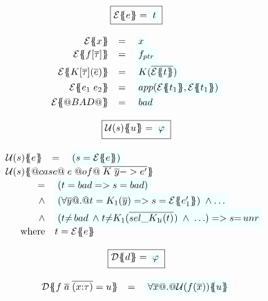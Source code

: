 \begin{figure}\small
\setlength{\arraycolsep}{2pt}
\[\begin{array}{c}
\ruleform{\etrans{\Sigma}{\Gamma}{e} = \formula{t} } \\ \\
\begin{array}{rcl}
\etrans{\Sigma}{\Gamma}{x} & = & \formula{x} \\
\etrans{\Sigma}{\Gamma}{f[\ol{\tau}]} & = & \formula{f_{ptr}} \\
\etrans{\Sigma}{\Gamma}{K[\ol{\tau}](\ol{e})} & = & \formula{K(\ol{\etrans{e}{\Gamma}{t}})} \\
\etrans{\Sigma}{\Gamma}{e_1\;e_2} & = & \formula{app(\etrans{\Sigma}{\Gamma}{t_1},
                                                     \etrans{\Sigma}{\Gamma}{t_1})} \\
\etrans{\Sigma}{\Gamma}{@BAD@} & = & \formula{\bad}
\end{array}
\\ \\
\ruleform{\utrans{\Sigma}{u}{s} = \formula{\phi}} \\ \\
\begin{array}{rcl}
\utrans{\Sigma}{e}{s}
  & = & \formula{(s = \etrans{\Sigma}{\Gamma}{e})} \\
\multicolumn{3}{l}{\utrans{\Sigma}
    {@case@\;e\;@of@\;\ol{K\;\ol{y} -> e'}}{s}} \\
\multicolumn{3}{l}{
\quad
  \begin{array}[t]{rl}
    = & \formula{(t = \bad => s = bad)} \\
    \land & \formula{(\forall \ol{y} @.@ t = K_1(\ol{y}) => s = \etrans{\Sigma}{\Gamma}{e'_1})\;\land \ldots}  \\
    \land & \formula{(t{\neq}\bad\;\land\;
                 t{\neq}K_1(\oln{{\sel{K_1}{i}}(t)}{})\;\land\;\ldots) => s{=}\unr} \\
    \mbox{where} & t  =  \etrans{\Sigma}{\Gamma}{e}
 \end{array}
}
\end{array}
\\ \\
\ruleform{\dtrans{\Sigma}{d} = \formula{\phi}} \\ \\
\begin{array}{rcl}
  \dtrans{\Sigma}{f \;\ol{a}\;\ol{(x{:}\tau)} = u}
    & =     & \formula{\forall \ol{x} @.@ \utrans{\sigma}{u}{f(\ol{x})}} \\

\end{array}
\end{array}\]
\end{figure}
